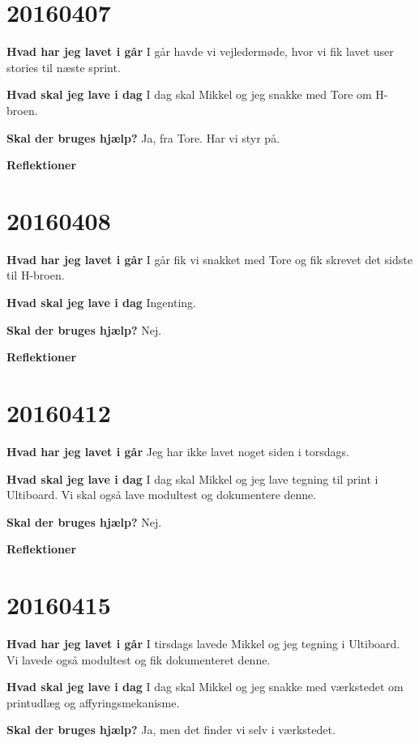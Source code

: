 \documentclass{article}
\begin{document}
	\section{20160407}
	
	\textbf{Hvad har jeg lavet i går}
	I går havde vi vejledermøde, hvor vi fik lavet user stories til næste sprint. 
	
	\textbf{Hvad skal jeg lave i dag}
	I dag skal Mikkel og jeg snakke med Tore om H-broen. 
	
	\textbf{Skal der bruges hjælp?}
	Ja, fra Tore. Har vi styr på. 
	
	\textbf{Reflektioner}
	
	\section{20160408}
	
	\textbf{Hvad har jeg lavet i går}
	I går fik vi snakket med Tore og fik skrevet det sidste til H-broen. 
	
	\textbf{Hvad skal jeg lave i dag}
	Ingenting. 
	
	\textbf{Skal der bruges hjælp?}
	Nej. 
	
	\textbf{Reflektioner}
	
	\section{20160412}
	
	\textbf{Hvad har jeg lavet i går}
	Jeg har ikke lavet noget siden i torsdags. 
	
	\textbf{Hvad skal jeg lave i dag}
	I dag skal Mikkel og jeg lave tegning til print i Ultiboard. Vi skal også lave modultest og dokumentere denne. 
	
	\textbf{Skal der bruges hjælp?}
	Nej. 
	
	\textbf{Reflektioner}
	
	\section{20160415}
	
	\textbf{Hvad har jeg lavet i går}
	I tirsdags lavede Mikkel og jeg tegning i Ultiboard. Vi lavede også modultest og fik dokumenteret denne. 
	
	\textbf{Hvad skal jeg lave i dag}
	I dag skal Mikkel og jeg snakke med værkstedet om printudlæg og affyringsmekanisme. 
	
	\textbf{Skal der bruges hjælp?}
	Ja, men det finder vi selv i værkstedet. 
	
\end{document}
